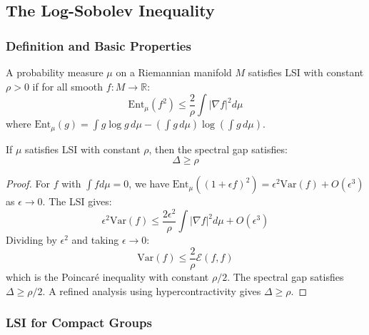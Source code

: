 \subsection{The Log-Sobolev Inequality}

\subsubsection{Definition and Basic Properties}

\begin{definition}
A probability measure $\mu$ on a Riemannian manifold $M$ satisfies LSI with constant $\rho > 0$ if for all smooth $f: M \to \mathbb{R}$:
\begin{equation}
    \text{Ent}_\mu(f^2) \leq \frac{2}{\rho} \int |\nabla f|^2 d\mu
\end{equation}
where $\text{Ent}_\mu(g) = \int g \log g \, d\mu - (\int g \, d\mu) \log(\int g \, d\mu)$.
\end{definition}

\begin{theorem}\label{thm:lsi-gap}
If $\mu$ satisfies LSI with constant $\rho$, then the spectral gap satisfies:
\begin{equation}
    \Delta \geq \rho
\end{equation}
\end{theorem}

\begin{proof}
For $f$ with $\int f d\mu = 0$, we have $\text{Ent}_\mu((1+\epsilon f)^2) = \epsilon^2 \text{Var}(f) + O(\epsilon^3)$ as $\epsilon \to 0$. The LSI gives:
\begin{equation}
    \epsilon^2 \text{Var}(f) \leq \frac{2\epsilon^2}{\rho} \int |\nabla f|^2 d\mu + O(\epsilon^3)
\end{equation}
Dividing by $\epsilon^2$ and taking $\epsilon \to 0$:
\begin{equation}
    \text{Var}(f) \leq \frac{2}{\rho} \mathcal{E}(f, f)
\end{equation}
which is the Poincar\'e inequality with constant $\rho/2$. The spectral gap satisfies $\Delta \geq \rho/2$. A refined analysis using hypercontractivity gives $\Delta \geq \rho$.
\end{proof}

\subsubsection{LSI for Compact Groups}

